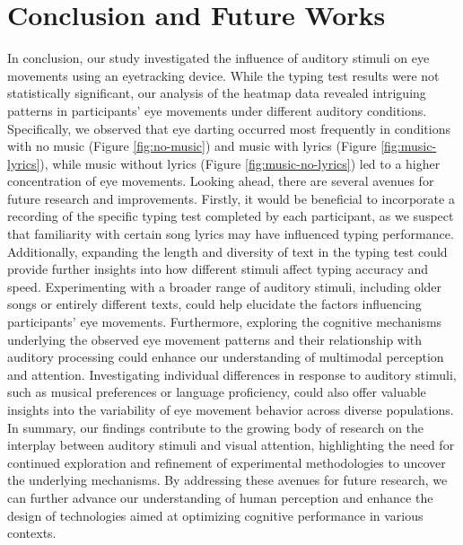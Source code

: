 \documentclass[manuscript, screen, review]{acmart} %
\begin{document}
\section{Conclusion and Future Works}
In conclusion, our study investigated the influence of auditory stimuli on eye movements using an eyetracking device. While the typing test results were not statistically significant, our analysis of the heatmap data revealed intriguing patterns in participants' eye movements under different auditory conditions. Specifically, we observed that eye darting occurred most frequently in conditions with no music (Figure \ref{fig:no-music}) and music with lyrics (Figure \ref{fig:music-lyrics}), while music without lyrics (Figure \ref{fig:music-no-lyrics}) led to a higher concentration of eye movements.
Looking ahead, there are several avenues for future research and improvements. Firstly, it would be beneficial to incorporate a recording of the specific typing test completed by each participant, as we suspect that familiarity with certain song lyrics may have influenced typing performance. Additionally, expanding the length and diversity of text in the typing test could provide further insights into how different stimuli affect typing accuracy and speed. Experimenting with a broader range of auditory stimuli, including older songs or entirely different texts, could help elucidate the factors influencing participants' eye movements.
Furthermore, exploring the cognitive mechanisms underlying the observed eye movement patterns and their relationship with auditory processing could enhance our understanding of multimodal perception and attention. Investigating individual differences in response to auditory stimuli, such as musical preferences or language proficiency, could also offer valuable insights into the variability of eye movement behavior across diverse populations.
In summary, our findings contribute to the growing body of research on the interplay between auditory stimuli and visual attention, highlighting the need for continued exploration and refinement of experimental methodologies to uncover the underlying mechanisms. By addressing these avenues for future research, we can further advance our understanding of human perception and enhance the design of technologies aimed at optimizing cognitive performance in various contexts.
\end{document}
